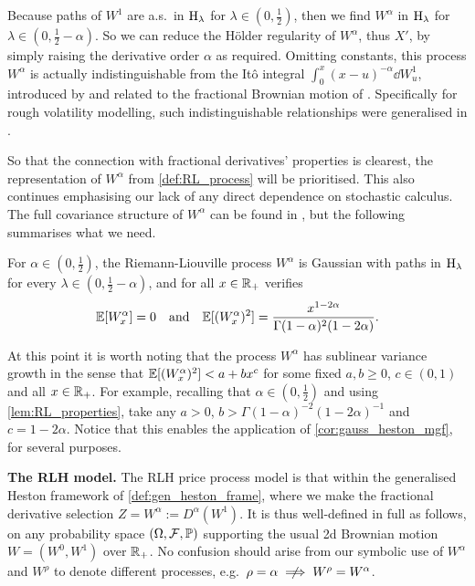 Because paths of $W^1$ are a.s.~in $\mathrm{H}_\lambda$ for $\lambda\in(0,\frac12)$, then we find $W^\alpha$ in $\mathrm{H}_\lambda$ for $\lambda\in(0,\frac12-\alpha)$. So we can reduce the H\"older regularity of $W^\alpha$, thus $X'$, by simply raising the derivative order $\alpha$ as required. Omitting constants, this process $W^\alpha$ is actually indistinguishable from the It\^o integral $\int_0^x(x-u)^{-\alpha}\dd W^1_u$, introduced by \cite{levy_1953} and related to the fractional Brownian motion of \cite{mandelbrot_1968}. Specifically for rough volatility modelling, such indistinguishable relationships were generalised in \cite{horvath_2024}.

So that the connection with fractional derivatives' properties is clearest, the representation of $W^\alpha$ from \autoref{def:RL_process} will be prioritised. This also continues emphasising our lack of any direct dependence on stochastic calculus. The full covariance structure of $W^\alpha$ can be found in \cite{jacquier_2018}, but the following summarises what we need.

\begin{lemma}\label{lem:RL_properties}
    For $\alpha\in(0,\frac12)$, the Riemann-Liouville process $W^\alpha$ is Gaussian with paths in $\mathrm{H}_\lambda$ for every $\lambda\in(0,\frac12-\alpha)$, and for all $x\in\mathbb{R}_+$ verifies~
    \begin{equation}
        \mathbb{E}[W^\alpha_x]=0 \quad\text{and}\quad \mathbb{E}[(W^\alpha_x)^2] = \frac{x^{1-2\alpha}}{\Gamma(1-\alpha)^2(1-2\alpha)}.
    \end{equation}
\end{lemma}

At this point it is worth noting that the process $W^\alpha$ has sublinear variance growth in the sense that $\mathbb{E}[(W^\alpha_x)^2]<a+b x^c$ for some fixed $a,b\ge0$, $c\in(0,1)$ and all $x\in\mathbb{R}_+$. For example, recalling that $\alpha\in(0,\frac12)$ and using \autoref{lem:RL_properties}, take any $a>0$, $b>\Gamma(1-\alpha)^{-2}(1-2\alpha)^{-1}$ and $c=1-2\alpha$. Notice that this enables the application of \autoref{cor:gauss_heston_mgf}, for several purposes.

\vspace{3mm}\textbf{The RLH model.} The RLH price process model is that within the generalised Heston framework of \autoref{def:gen_heston_frame}, where we make the fractional derivative selection $Z=W^\alpha:=D^\alpha(W^1)$. It is thus well-defined in full as follows, on any probability space $(\Omega,\mathcal{F},\mathbb{P})$ supporting the usual 2d Brownian motion $W=(W^0,W^1)$ over $\mathbb{R}_+$. No confusion should arise from our symbolic use of $W^\alpha$ and $W^\rho$ to denote different processes, e.g.~$\rho=\alpha\centernot\implies W^\rho=W^\alpha$.

